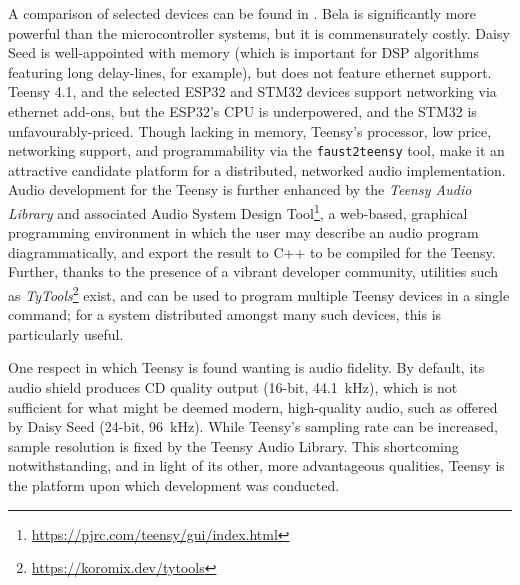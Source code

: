 A comparison of selected devices can be found in
.
Bela is significantly more powerful than the microcontroller systems, but it is
commensurately costly.
Daisy Seed is well-appointed with memory (which is important for DSP algorithms
featuring long delay-lines, for example), but does not feature ethernet support.
Teensy 4.1, and the selected ESP32 and STM32 devices support networking via
ethernet add-ons, but the ESP32's CPU is underpowered, and the STM32 is
unfavourably-priced.
Though lacking in memory, Teensy's processor, low price, networking support, and
programmability via the \texttt{faust2teensy} tool, make it an attractive
candidate platform for a distributed, networked audio implementation.
Audio development for the Teensy is further enhanced by the \textit{Teensy
Audio Library} and associated Audio System Design Tool\footnote{
    \url{https://pjrc.com/teensy/gui/index.html}
}, a web-based, graphical programming environment in which the user may describe
an audio program diagrammatically, and export the result to C++ to be compiled
for the Teensy.
Further, thanks to the presence of a vibrant developer community, utilities such
as \textit{TyTools}\footnote{\url{https://koromix.dev/tytools}} exist, and can
be used to program multiple Teensy devices in a single command;
for a system distributed amongst many such devices, this is particularly useful.

One respect in which Teensy is found wanting is audio fidelity.
By default, its audio shield produces CD quality output (16-bit,
\qty{44.1}{\kHz}), which is not sufficient for what might be deemed modern,
high-quality audio, such as offered by Daisy Seed (24-bit, \qty{96}{\kHz}).
While Teensy's sampling rate can be increased, sample resolution is fixed by
the Teensy Audio Library.
This shortcoming notwithstanding, and in light of its other, more advantageous
qualities, Teensy is the platform upon which development was conducted.

